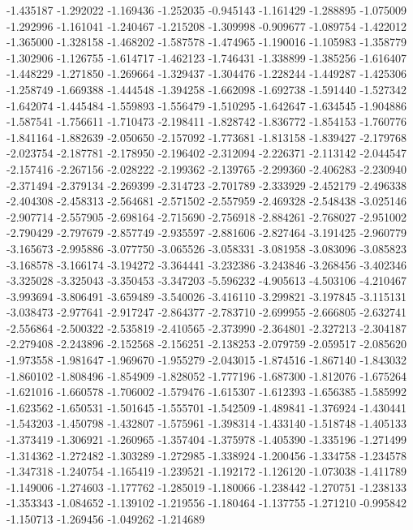 -1.435187
-1.292022
-1.169436
-1.252035
-0.945143
-1.161429
-1.288895
-1.075009
-1.292996
-1.161041
-1.240467
-1.215208
-1.309998
-0.909677
-1.089754
-1.422012
-1.365000
-1.328158
-1.468202
-1.587578
-1.474965
-1.190016
-1.105983
-1.358779
-1.302906
-1.126755
-1.614717
-1.462123
-1.746431
-1.338899
-1.385256
-1.616407
-1.448229
-1.271850
-1.269664
-1.329437
-1.304476
-1.228244
-1.449287
-1.425306
-1.258749
-1.669388
-1.444548
-1.394258
-1.662098
-1.692738
-1.591440
-1.527342
-1.642074
-1.445484
-1.559893
-1.556479
-1.510295
-1.642647
-1.634545
-1.904886
-1.587541
-1.756611
-1.710473
-2.198411
-1.828742
-1.836772
-1.854153
-1.760776
-1.841164
-1.882639
-2.050650
-2.157092
-1.773681
-1.813158
-1.839427
-2.179768
-2.023754
-2.187781
-2.178950
-2.196402
-2.312094
-2.226371
-2.113142
-2.044547
-2.157416
-2.267156
-2.028222
-2.199362
-2.139765
-2.299360
-2.406283
-2.230940
-2.371494
-2.379134
-2.269399
-2.314723
-2.701789
-2.333929
-2.452179
-2.496338
-2.404308
-2.458313
-2.564681
-2.571502
-2.557959
-2.469328
-2.548438
-3.025146
-2.907714
-2.557905
-2.698164
-2.715690
-2.756918
-2.884261
-2.768027
-2.951002
-2.790429
-2.797679
-2.857749
-2.935597
-2.881606
-2.827464
-3.191425
-2.960779
-3.165673
-2.995886
-3.077750
-3.065526
-3.058331
-3.081958
-3.083096
-3.085823
-3.168578
-3.166174
-3.194272
-3.364441
-3.232386
-3.243846
-3.268456
-3.402346
-3.325028
-3.325043
-3.350453
-3.347203
-5.596232
-4.905613
-4.503106
-4.210467
-3.993694
-3.806491
-3.659489
-3.540026
-3.416110
-3.299821
-3.197845
-3.115131
-3.038473
-2.977641
-2.917247
-2.864377
-2.783710
-2.699955
-2.666805
-2.632741
-2.556864
-2.500322
-2.535819
-2.410565
-2.373990
-2.364801
-2.327213
-2.304187
-2.279408
-2.243896
-2.152568
-2.156251
-2.138253
-2.079759
-2.059517
-2.085620
-1.973558
-1.981647
-1.969670
-1.955279
-2.043015
-1.874516
-1.867140
-1.843032
-1.860102
-1.808496
-1.854909
-1.828052
-1.777196
-1.687300
-1.812076
-1.675264
-1.621016
-1.660578
-1.706002
-1.579476
-1.615307
-1.612393
-1.656385
-1.585992
-1.623562
-1.650531
-1.501645
-1.555701
-1.542509
-1.489841
-1.376924
-1.430441
-1.543203
-1.450798
-1.432807
-1.575961
-1.398314
-1.433140
-1.518748
-1.405133
-1.373419
-1.306921
-1.260965
-1.357404
-1.375978
-1.405390
-1.335196
-1.271499
-1.314362
-1.272482
-1.303289
-1.272985
-1.338924
-1.200456
-1.334758
-1.234578
-1.347318
-1.240754
-1.165419
-1.239521
-1.192172
-1.126120
-1.073038
-1.411789
-1.149006
-1.274603
-1.177762
-1.285019
-1.180066
-1.238442
-1.270751
-1.238133
-1.353343
-1.084652
-1.139102
-1.219556
-1.180464
-1.137755
-1.271210
-0.995842
-1.150713
-1.269456
-1.049262
-1.214689
